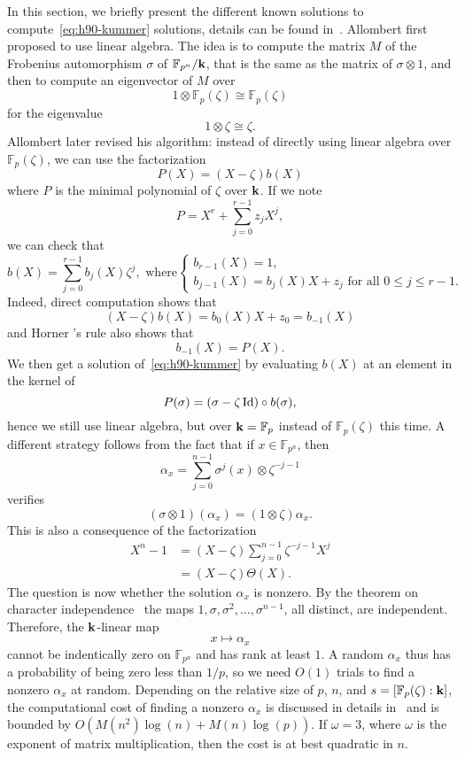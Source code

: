 In this section, we briefly present the different known solutions to
compute~\eqref{eq:h90-kummer} solutions, details can be found in~\cite{BDDFS17}.
Allombert first proposed to use linear
algebra. The idea is to compute the matrix $M$ of the Frobenius automorphism
$\sigma$ of $\mathbb{F}_{p^n}/\mathbf{k}$, that is the same as the matrix of
$\sigma\otimes1$, and then to compute an eigenvector of $M$ over
\[
  1\otimes\mathbb{F}_{p}(\zeta) \cong \mathbb{F}_{p}(\zeta)
\]
for the eigenvalue
\[
  1\otimes\zeta\cong\zeta.
\]
Allombert later revised his algorithm: instead of directly using linear algebra over
$\mathbb{F}_{p}(\zeta)$, we can use the factorization
\[
  P(X) = (X-\zeta)b(X)
\]
where $P$ is the minimal polynomial of $\zeta$ over $\mathbf{k}$. If we note
\[
  P = X^r + \sum_{j=0}^{r-1}z_jX^j,
\]
we can check that
\[
  b(X) = \sum_{j=0}^{r-1}b_j(X)\zeta^j,\text{ where}
  \left\{ 
    \begin{array}{l}
      b_{r-1}(X) = 1,\\
      b_{j-1}(X) = b_j(X) X + z_j\text{ for all } 0\leq j\leq r-1.
    \end{array}
  \right.
\]
Indeed, direct computation shows that
\[
  (X-\zeta)b(X) = b_0(X)X+z_0  = b_{-1}(X)
\]
and Horner 's rule also shows that
\[
  b_{-1}(X) = P(X).
\]
We then get a solution of~\eqref{eq:h90-kummer} by evaluating $b(X)$ at an
element in the kernel of 
\[
  P(\sigma)=(\sigma-\zeta\operatorname{Id})\circ b(\sigma),
\]
hence we still use linear algebra, but
over $\mathbf{k}=\mathbb{F}_p$ instead of $\mathbb{F}_{p}(\zeta)$ this time. A different
strategy follows from the fact that if $x\in\mathbb{F}_{p^n}$, then
\[
  \alpha_x=\sum_{j=0}^{n-1}\sigma^j(x)\otimes\zeta^{-j-1}
\]
verifies
\[
  (\sigma\otimes1)(\alpha_x) = (1\otimes\zeta)\alpha_x.
\]
This is also a consequence of the factorization
\begin{align*}
  X^n-1 &= (X-\zeta)\sum_{j=0}^{n-1}\zeta^{-j-1}X^j\\
  &= (X-\zeta)\Theta(X).
\end{align*}
The question is now whether the solution $\alpha_x$ is nonzero. By the theorem
on character independence~\cite[Chapter VI, §4]{Lang04} the maps
$1, \sigma, \sigma^2, \dots, \sigma^{n-1}$, all distinct, are independent.
Therefore, the $\mathbf{k}$-linear map
\[
  x\mapsto\alpha_x
\]
cannot be indentically zero on $\mathbb{F}_{p^n}$ and has rank at least $1$. A
random $\alpha_x$ thus has a probability of being zero less than $1/p$, so we
need $O(1)$ trials to find a nonzero $\alpha_x$ at random. Depending on the
relative size of $p$, $n$, and $s=\left[ \mathbb{F}_p(\zeta):\mathbf{k} \right]$, the
computational cost of finding a nonzero $\alpha_x$ is discussed in details
in~\cite{BDDFS17} and is bounded by $O(M(n^2)\log(n)+M(n)\log(p))$. If
$\omega=3$, where $\omega$ is the exponent of matrix
multiplication, then the cost is at best quadratic in $n$.

